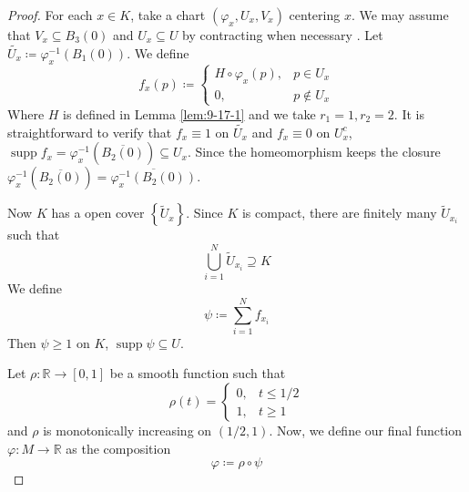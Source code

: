 \documentclass[../main.tex]{subfiles}
\begin{document}
\begin{proof}
    For each \(  x \in K  \), take a chart \(  \left(  \varphi _{x}, U_{x},V_{x} \right)   \) centering \(  x  \). We may assume that \(  V_{x} \subseteq B_{3}\left( 0 \right)   \) and \(  U_{x}\subseteq U  \)  by contracting  when necessary . Let \(  \tilde{U_{x}}  \coloneqq  \varphi _{x}^{-1} \left( B_{1}\left( 0 \right)  \right) \). We define \[
    f_{x}\left( p \right)\coloneqq \begin{cases} H\circ  \varphi _{x}\left( p \right),&p\in U_{x}\\ 
     0,& p \not \in U_{x}  \end{cases}  
    \]   Where \(  H  \) is defined in Lemma \ref{lem:9-17-1}  and we take \(  r_1= 1, r_2= 2  \).   It is straightforward to verify that \(  f_{x}\equiv 1  \) on \(  \tilde{U_{x}}  \) and \(  f_{x}\equiv 0  \) on \(  U_{x}^{c}  \), \(  \operatorname{supp}f_{x}=  \varphi _{x}^{-1} \left( \overline{B_2\left( 0 \right) } \right)  \subseteq U_{x} \). Since the homeomorphism keeps the closure \(   \varphi _{x}^{-1} \left( \overline{B_{2}\left( 0 \right) } \right)= \overline{ \varphi _{x}^{-1} \left( B_{2}\left( 0 \right)  \right) }   \). 
  
    Now \(  K  \) has a open cover \(  \left\{ \tilde{U}_{x} \right\}  \). Since \(  K  \) is compact, there are finitely many \(  \tilde{U}_{x_{i}}  \) such that \[
    \bigcup _{i= 1}^{N} \tilde{U}_{x_{i}}\supseteq K
    \]    We define \[
    \psi \coloneqq \sum _{i= 1}^{N}f_{x_{i}}
    \]Then \(  \psi \ge 1 \) on \(  K  \), \(  \operatorname{supp}\psi \subseteq U  \).    

    Let $\rho: \mathbb{R} \to [0, 1]$ be a smooth function such that
$$\rho(t) = \begin{cases} 
0, & t \le 1/2 \\
1, & t \ge 1
\end{cases}$$
and $\rho$ is monotonically increasing on $(1/2, 1)$. 
Now, we define our final function $\varphi: M \to \mathbb{R}$ as the composition
$$\varphi \coloneqq \rho \circ \psi $$
\end{proof}
\end{document}
